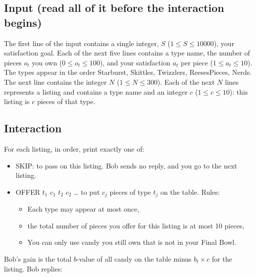 \documentclass[11pt]{article}
\begin{document}
\subsection*{Input (read all of it before the interaction begins)}

The first line of the input contains a single integer, $S$
($1 \le S \le 10000$), your satisfaction goal.
Each of the next five lines contains a type name, the number of pieces $o_t$
you own ($0 \le o_t \le 100$), and your satisfaction $a_t$ per piece
($1 \le a_t \le 10$). The types appear in the order Starburst, Skittles,
Twizzlers, ReesesPieces, Nerds.
The next line contains the integer $N$ ($1 \le N \le 300$). Each of the next
$N$ lines represents a listing and contains a type name and an integer $c$
($1 \le c \le 10$): this listing is $c$ pieces of that type.

\subsection*{Interaction}

For each listing, in order, print exactly one of:

\begin{itemize}
  \item SKIP: to pass on this listing. Bob sends no reply, and you go to the
        next listing.
  \item OFFER $t_1$ $c_1$ $t_2$ $c_2$ \ldots{} to put $c_j$ pieces of type
        $t_j$ on the table. Rules:
        \begin{itemize}
          \item Each type may appear at most once,
          \item the total number of pieces you offer for this listing is at
                most 10 pieces,
          \item You can only use candy you still own that is not in your Final
                Bowl.
        \end{itemize}
\end{itemize}

Bob's gain is the total $b$-value of all candy on the table minus
$b_t \times c$ for the listing. Bob replies:
\end{document}
